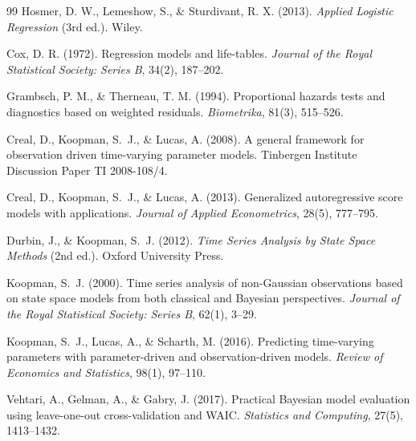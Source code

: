 \documentclass[11pt,a4paper]{article}
\begin{document}

\begin{thebibliography}{99}
Hosmer, D. W., Lemeshow, S., \& Sturdivant, R. X. (2013).
\newblock \textit{Applied Logistic Regression} (3rd ed.). Wiley.

Cox, D. R. (1972).
\newblock Regression models and life-tables.
\newblock \textit{Journal of the Royal Statistical Society: Series B}, 34(2), 187--202.

Grambsch, P. M., \& Therneau, T. M. (1994).
\newblock Proportional hazards tests and diagnostics based on weighted residuals.
\newblock \textit{Biometrika}, 81(3), 515--526.


Creal, D., Koopman, S.~J., \& Lucas, A. (2008).
\newblock A general framework for observation driven time-varying parameter models.
\newblock Tinbergen Institute Discussion Paper TI 2008-108/4.

Creal, D., Koopman, S.~J., \& Lucas, A. (2013).
\newblock Generalized autoregressive score models with applications.
\newblock \textit{Journal of Applied Econometrics}, 28(5), 777--795.

Durbin, J., \& Koopman, S.~J. (2012).
\newblock \textit{Time Series Analysis by State Space Methods} (2nd ed.).
\newblock Oxford University Press.

Koopman, S.~J. (2000).
\newblock Time series analysis of non-Gaussian observations based on state space models from both classical and Bayesian perspectives.
\newblock \textit{Journal of the Royal Statistical Society: Series B}, 62(1), 3--29.

Koopman, S.~J., Lucas, A., \& Scharth, M. (2016).
\newblock Predicting time-varying parameters with parameter-driven and observation-driven models.
\newblock \textit{Review of Economics and Statistics}, 98(1), 97--110.

Vehtari, A., Gelman, A., \& Gabry, J. (2017).
\newblock Practical Bayesian model evaluation using leave-one-out cross-validation and WAIC.
\newblock \textit{Statistics and Computing}, 27(5), 1413--1432.

\end{thebibliography}
\end{document}

